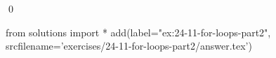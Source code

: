 
\begin{ex}
  \label{ex:24-11-for-loops-part2}
  
  \qed
\end{ex}
\begin{python0}
from solutions import *
add(label="ex:24-11-for-loops-part2",
    srcfilename='exercises/24-11-for-loops-part2/answer.tex')
\end{python0}
